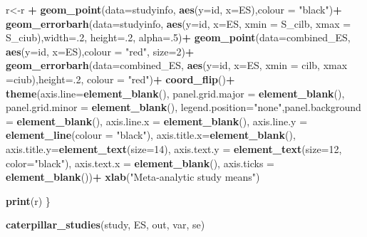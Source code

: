 \documentclass[
]{book}
\newenvironment{Shaded}{\begin{snugshade}}{\end{snugshade}}
\newcommand{\AttributeTok}[1]{\textcolor[rgb]{0.13,0.29,0.53}{#1}}
\newcommand{\DecValTok}[1]{\textcolor[rgb]{0.00,0.00,0.81}{#1}}
\newcommand{\FunctionTok}[1]{\textcolor[rgb]{0.13,0.29,0.53}{\textbf{#1}}}
\newcommand{\NormalTok}[1]{#1}
\newcommand{\OtherTok}[1]{\textcolor[rgb]{0.56,0.35,0.01}{#1}}
\newcommand{\SpecialCharTok}[1]{\textcolor[rgb]{0.81,0.36,0.00}{\textbf{#1}}}
\newcommand{\StringTok}[1]{\textcolor[rgb]{0.31,0.60,0.02}{#1}}
\begin{document}
\begin{Shaded}
\begin{Highlighting}[]
\NormalTok{  r}\OtherTok{\textless{}{-}}\NormalTok{r }\SpecialCharTok{+} \FunctionTok{geom\_point}\NormalTok{(}\AttributeTok{data=}\NormalTok{studyinfo, }\FunctionTok{aes}\NormalTok{(}\AttributeTok{y=}\NormalTok{id, }\AttributeTok{x=}\NormalTok{ES),}\AttributeTok{colour =} \StringTok{"black"}\NormalTok{)}\SpecialCharTok{+}
    \FunctionTok{geom\_errorbarh}\NormalTok{(}\AttributeTok{data=}\NormalTok{studyinfo, }\FunctionTok{aes}\NormalTok{(}\AttributeTok{y=}\NormalTok{id, }\AttributeTok{x=}\NormalTok{ES, }\AttributeTok{xmin =}\NormalTok{ S\_cilb, }\AttributeTok{xmax =}\NormalTok{  S\_ciub),}\AttributeTok{width=}\NormalTok{.}\DecValTok{2}\NormalTok{,  }\AttributeTok{height=}\NormalTok{.}\DecValTok{2}\NormalTok{, }\AttributeTok{alpha=}\NormalTok{.}\DecValTok{5}\NormalTok{)}\SpecialCharTok{+}
    \FunctionTok{geom\_point}\NormalTok{(}\AttributeTok{data=}\NormalTok{combined\_ES, }\FunctionTok{aes}\NormalTok{(}\AttributeTok{y=}\NormalTok{id, }\AttributeTok{x=}\NormalTok{ES),}\AttributeTok{colour =} \StringTok{"red"}\NormalTok{, }\AttributeTok{size=}\DecValTok{2}\NormalTok{)}\SpecialCharTok{+}
    \FunctionTok{geom\_errorbarh}\NormalTok{(}\AttributeTok{data=}\NormalTok{combined\_ES, }\FunctionTok{aes}\NormalTok{(}\AttributeTok{y=}\NormalTok{id, }\AttributeTok{x=}\NormalTok{ES, }\AttributeTok{xmin =}\NormalTok{ cilb, }\AttributeTok{xmax =}\NormalTok{ciub),}\AttributeTok{height=}\NormalTok{.}\DecValTok{2}\NormalTok{, }\AttributeTok{colour =} \StringTok{"red"}\NormalTok{)}\SpecialCharTok{+}
    \FunctionTok{coord\_flip}\NormalTok{()}\SpecialCharTok{+}
    \FunctionTok{theme}\NormalTok{(}\AttributeTok{axis.line=}\FunctionTok{element\_blank}\NormalTok{(), }\AttributeTok{panel.grid.major =} \FunctionTok{element\_blank}\NormalTok{(), }\AttributeTok{panel.grid.minor =} \FunctionTok{element\_blank}\NormalTok{(),}
          \AttributeTok{legend.position=}\StringTok{"none"}\NormalTok{,}\AttributeTok{panel.background =} \FunctionTok{element\_blank}\NormalTok{(), }\AttributeTok{axis.line.x =} \FunctionTok{element\_blank}\NormalTok{(), }\AttributeTok{axis.line.y =} \FunctionTok{element\_line}\NormalTok{(}\AttributeTok{colour =} \StringTok{"black"}\NormalTok{),}
          \AttributeTok{axis.title.x=}\FunctionTok{element\_blank}\NormalTok{(), }\AttributeTok{axis.title.y=}\FunctionTok{element\_text}\NormalTok{(}\AttributeTok{size=}\DecValTok{14}\NormalTok{), }\AttributeTok{axis.text.y =} \FunctionTok{element\_text}\NormalTok{(}\AttributeTok{size=}\DecValTok{12}\NormalTok{, }\AttributeTok{color=}\StringTok{"black"}\NormalTok{), }\AttributeTok{axis.text.x =} \FunctionTok{element\_blank}\NormalTok{(), }\AttributeTok{axis.ticks =} \FunctionTok{element\_blank}\NormalTok{())}\SpecialCharTok{+}
    \FunctionTok{xlab}\NormalTok{(}\StringTok{"Meta{-}analytic study means"}\NormalTok{)}
  
 \FunctionTok{print}\NormalTok{(r)}
\NormalTok{\}}

\FunctionTok{caterpillar\_studies}\NormalTok{(study, ES, out, var, se)}
\end{Highlighting}
\end{Shaded}
\end{document}
